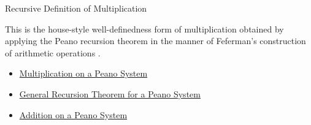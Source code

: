 \begin{topicbox}{Recursive Definition of Multiplication}
\begin{remark*}[Interpretation]
This is the house-style well-definedness form of multiplication obtained by
applying the Peano recursion theorem in the manner of Feferman's construction
of arithmetic operations \citep{FefermanNumberSystems1964}.
\end{remark*}

\begin{dependencies}
\begin{itemize}
  \item \hyperref[def:multiplication-on-peano-system]{Multiplication on a Peano System}
  \item \hyperref[thm:general-recursion-theorem-for-peano-system]{General Recursion Theorem for a Peano System}
  \item \hyperref[def:addition-on-peano-system]{Addition on a Peano System}
\end{itemize}
\end{dependencies}
\end{topicbox}

